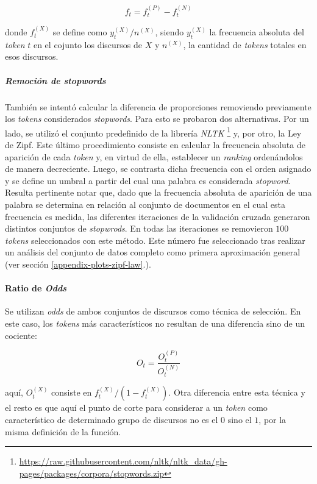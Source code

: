 \begin{equation}
    f_t = f_{t}^{(P)}-f_{t}^{(N)}
\end{equation}


donde $f_{t}^{(X)}$ se define como $y_{t}^{(X)} / n^{(X)}$, siendo $y_{t}^{(X)}$
la frecuencia absoluta del \textit{token} $t$ en el cojunto los discursos de $X$
y $n^{(X)}$, la cantidad de \textit{tokens} totales en esos discursos.

\subparagraph{Remoci\'on de \textit{stopwords}}
\label{paragraph-methods-proportions-stopwords}
Tambi\'en se intent\'o calcular la diferencia de proporciones removiendo
previamente los \textit{tokens} considerados \textit{stopwords}.
Para esto se probaron dos alternativas.
Por un lado, se utiliz\'o el conjunto predefinido de la librer\'ia \textit{NLTK}
\footnote{\url{https://raw.githubusercontent.com/nltk/nltk_data/gh-pages/packages/corpora/stopwords.zip}}
y, por otro, la Ley de Zipf.
Este \'ultimo procedimiento consiste en calcular la frecuencia absoluta de aparici\'on de
cada \textit{token} y, en virtud de ella, establecer un \textit{ranking}
orden\'andolos de manera decreciente.
Luego, se contrasta dicha frecuencia con el orden asignado y se define
un umbral a partir del cual una palabra es considerada \textit{stopword}.
Resulta pertinente notar que, dado que la frecuencia absoluta de aparici\'on
de una palabra se determina en relaci\'on al conjunto de documentos en el cual
esta frecuencia es medida, las diferentes iteraciones de la validaci\'on cruzada
generaron distintos conjuntos de \textit{stopwrods}.
En todas las iteraciones se removieron $100$ \textit{tokens} seleccionados
con este m\'etodo. Este n\'umero fue seleccionado tras realizar un an\'alisis del
conjunto de datos completo como primera aproximaci\'on general (ver secci\'on
\ref{appendix-plots-zipf-law}.).

\paragraph{Ratio de \textit{Odds}}
Se utilizan \textit{odds} de ambos conjuntos de discursos como
t\'ecnica de selecci\'on. En este caso, los \textit{tokens} m\'as caracter\'isticos
no resultan de una diferencia sino de un cociente:

\begin{equation}
    O_{t} = \frac{O_{t}^{(P)}}{O_{t}^{(N)}}
\end{equation}

aqu\'i, $O_{t}^{(X)}$ consiste en $f_{t}^{(X)}/(1-f_{t}^{(X)})$.
Otra diferencia entre esta t\'ecnica y el resto es que aqu\'i el punto de
corte para considerar a un \textit{token} como caracter\'istico de
determinado grupo de discursos no es el $0$ sino el $1$, por la misma
definici\'on de la funci\'on.

